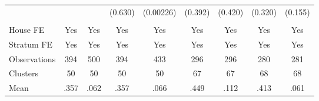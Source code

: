 {\begin{tabular}{l*{8}{c}}
                &         &         &  (0.630)&(0.00226)&  (0.392)&  (0.420)&  (0.320)&  (0.155)\\
                &         &         &         &         &         &         &         &         \\
House FE        &      Yes&      Yes&      Yes&      Yes&      Yes&      Yes&      Yes&      Yes\\
Stratum FE      &      Yes&      Yes&      Yes&      Yes&      Yes&      Yes&      Yes&      Yes\\
\midrule
Observations    &      394&      500&      394&      433&      296&      296&      280&      281\\
Clusters        &       50&       50&       50&       50&       67&       67&       68&       68\\
Mean            &     .357&     .062&     .357&     .066&     .449&     .112&     .413&     .061\\
\bottomrule
\end{tabular}
}

